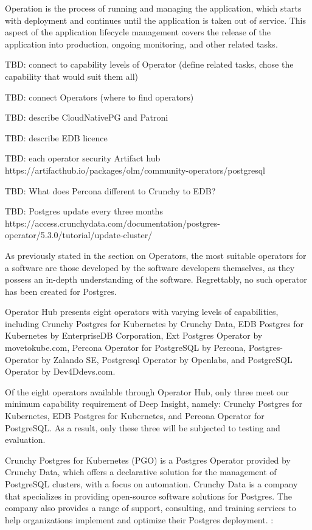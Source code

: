 Operation is the process of running and managing the application, which starts with deployment and continues until the application is taken out of service. This aspect of the application lifecycle management covers the release of the application into production, ongoing monitoring, and other related tasks. \cite{ALM}

TBD: connect to capability levels of Operator (define related tasks, chose the capability that would suit them all)



TBD: connect Operators (where to find operators)

TBD: describe CloudNativePG and Patroni

TBD: describe EDB licence

TBD: each operator security Artifact hub https://artifacthub.io/packages/olm/community-operators/postgresql

TBD: What does Percona different to Crunchy to EDB?

TBD: Postgres update every three months https://access.crunchydata.com/documentation/postgres-operator/5.3.0/tutorial/update-cluster/

As previously stated in the section on Operators, the most suitable operators for a software are those developed by the software developers themselves, as they possess an in-depth understanding of the software. Regrettably, no such operator has been created for Postgres.

Operator Hub presents eight operators with varying levels of capabilities, including Crunchy Postgres for Kubernetes by Crunchy Data, EDB Postgres for Kubernetes by EnterpriseDB Corporation, Ext Postgres Operator by movetokube.com, Percona Operator for PostgreSQL by Percona, Postgres-Operator by Zalando SE, Postgresql Operator by Openlabs, and PostgreSQL Operator by Dev4Ddevs.com.

Of the eight operators available through Operator Hub, only three meet our minimum capability requirement of Deep Insight, namely: Crunchy Postgres for Kubernetes, EDB Postgres for Kubernetes, and Percona Operator for PostgreSQL. As a result, only these three will be subjected to testing and evaluation.

\pagebreak
{}
Crunchy Postgres for Kubernetes (PGO) is a Postgres Operator provided by Crunchy Data, which offers a declarative solution for the management of PostgreSQL clusters, with a focus on automation.
Crunchy Data is a company that specializes in providing open-source software solutions for Postgres. The company also provides a range of support, consulting, and training services to help organizations implement and optimize their Postgres deployment. \cite{Crunchy}:


